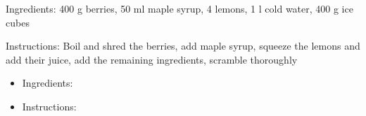 Ingredients:
400 g berries, 50 ml maple syrup, 4 lemons, 1 l cold water, 400 g ice cubes

\noindent Instructions: Boil and shred the berries, add maple syrup, squeeze the lemons and add their juice, add the remaining ingredients, scramble thoroughly

\begin{itemize}
	\item Ingredients:

	\item Instructions:
\end{itemize}